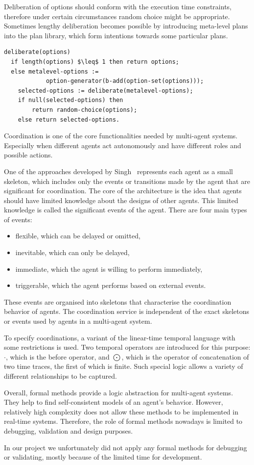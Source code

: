 Deliberation of options should conform with the execution time constraints, therefore under certain circumstances random choice might be appropriate.
Sometimes lengthy deliberation becomes possible by introducing meta-level plans into the plan library, which form intentions towards some particular plans.

\begin{lstlisting}[mathescape, caption={Option deliberation for BDI interpreter~\cite{Singh_92}.}]
  deliberate(options)
  if length(options) $\leq$ 1 then return options;
  else metalevel-options :=
            option-generator(b-add(option-set(options)));
    selected-options := deliberate(metalevel-options);
    if null(selected-options) then
        return random-choice(options);
    else return selected-options.
\end{lstlisting}

Coordination is one of the core functionalities needed by multi-agent systems.
Especially when different agents act autonomously and have different roles and possible actions.

One of the approaches developed by Singh~\cite{Singh_97} represents each agent as a small skeleton, which includes only the events or transitions made by the agent that are significant for coordination.
The core of the architecture is the idea that agents should have limited knowledge about the designs of other agents.
This limited knowledge is called the significant events of the agent.
There are four main types of events:
\begin{itemize}
  \item flexible, which can be delayed or omitted,
  \item inevitable, which can only be delayed,
  \item immediate, which the agent is willing to perform immediately,
  \item triggerable, which the agent performs based on external events.
\end{itemize}
These events are organised into skeletons that characterise the coordination behavior of agents.
The coordination service is independent of the exact skeletons or events used by agents in a multi-agent system.

To specify coordinations, a variant of the linear-time temporal language with some restrictions is used.
Two temporal operators are introduced for this purpose: $\cdot$, which is the before operator, and $\bigodot$, which is the operator of concatenation of two time traces, the first of which is finite.
Such special logic allows a variety of different relationships to be captured.

Overall, formal methods provide a logic abstraction for multi-agent systems.
They help to find self-consistent models of an agent's behavior.
However, relatively high complexity does not allow these methods to be implemented in real-time systems.
Therefore, the role of formal methods nowadays is limited to debugging, validation and design purposes.

In our project we unfortunately did not apply any formal methods for debugging or validating, mostly because of the limited time for development.
